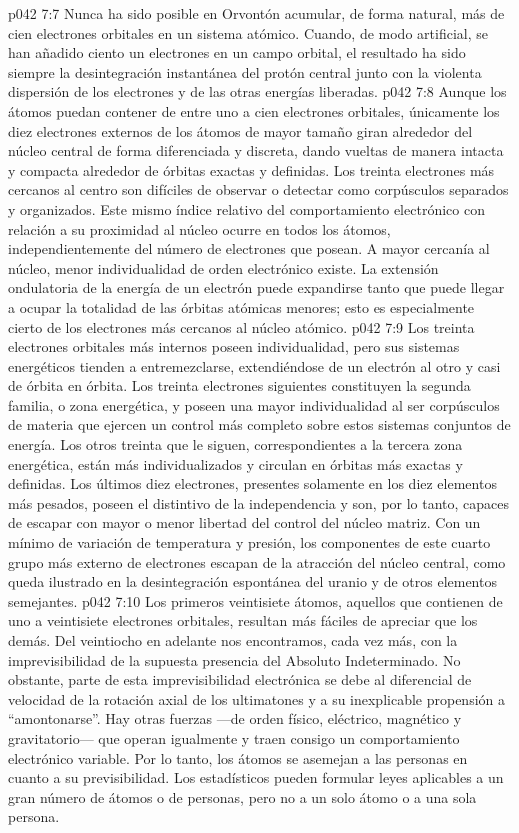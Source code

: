 \vs p042 7:7 \pc Nunca ha sido posible en Orvontón acumular, de forma natural, más de cien electrones orbitales en un sistema atómico. Cuando, de modo artificial, se han añadido ciento un electrones en un campo orbital, el resultado ha sido siempre la desintegración instantánea del protón central junto con la violenta dispersión de los electrones y de las otras energías liberadas.
\vs p042 7:8 \pc Aunque los átomos puedan contener de entre uno a cien electrones orbitales, únicamente los diez electrones externos de los átomos de mayor tamaño giran alrededor del núcleo central de forma diferenciada y discreta, dando vueltas de manera intacta y compacta alrededor de órbitas exactas y definidas. Los treinta electrones más cercanos al centro son difíciles de observar o detectar como corpúsculos separados y organizados. Este mismo índice relativo del comportamiento electrónico con relación a su proximidad al núcleo ocurre en todos los átomos, independientemente del número de electrones que posean. A mayor cercanía al núcleo, menor individualidad de orden electrónico existe. La extensión ondulatoria de la energía de un electrón puede expandirse tanto que puede llegar a ocupar la totalidad de las órbitas atómicas menores; esto es especialmente cierto de los electrones más cercanos al núcleo atómico.
\vs p042 7:9 Los treinta electrones orbitales más internos poseen individualidad, pero sus sistemas energéticos tienden a entremezclarse, extendiéndose de un electrón al otro y casi de órbita en órbita. Los treinta electrones siguientes constituyen la segunda familia, o zona energética, y poseen una mayor individualidad al ser corpúsculos de materia que ejercen un control más completo sobre estos sistemas conjuntos de energía. Los otros treinta que le siguen, correspondientes a la tercera zona energética, están más individualizados y circulan en órbitas más exactas y definidas. Los últimos diez electrones, presentes solamente en los diez elementos más pesados, poseen el distintivo de la independencia y son, por lo tanto, capaces de escapar con mayor o menor libertad del control del núcleo matriz. Con un mínimo de variación de temperatura y presión, los componentes de este cuarto grupo más externo de electrones escapan de la atracción del núcleo central, como queda ilustrado en la desintegración espontánea del uranio y de otros elementos semejantes.
\vs p042 7:10 Los primeros veintisiete átomos, aquellos que contienen de uno a veintisiete electrones orbitales, resultan más fáciles de apreciar que los demás. Del veintiocho en adelante nos encontramos, cada vez más, con la imprevisibilidad de la supuesta presencia del Absoluto Indeterminado. No obstante, parte de esta imprevisibilidad electrónica se debe al diferencial de velocidad de la rotación axial de los ultimatones y a su inexplicable propensión a “amontonarse”. Hay otras fuerzas ---de orden físico, eléctrico, magnético y gravitatorio--- que operan igualmente y traen consigo un comportamiento electrónico variable. Por lo tanto, los átomos se asemejan a las personas en cuanto a su previsibilidad. Los estadísticos pueden formular leyes aplicables a un gran número de átomos o de personas, pero no a un solo átomo o a una sola persona.
